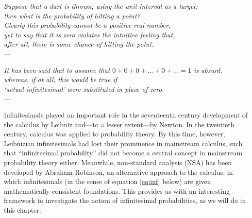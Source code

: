 \newcommand{\parthead}[2]{%
\bigskip

\begin{center}
  \spacedallcaps{Part #1}\\\vspace{.3em}
  \spacedallcaps{#2}
\end{center}

\medskip
}

\begin{flushright}
    {\footnotesize \textit{Suppose that a dart is thrown, using the unit interval as a target;\\
    then what is the probability of hitting a point?\\
    Clearly this probability cannot be a positive real number,\\
    yet to say that it is zero violates the intuitive feeling that,\\
    after all, there is some chance of hitting the point.}\\
    ---\citet[p.~171]{BernsteinWattenberg:1969}}
\end{flushright}

\begin{flushright}
    {\footnotesize \textit{It has been said that to assume that $0+0+0+ ... +0+ ... =1$ is absurd,\\
    whereas, if at all, this would be true if\\
    `actual infinitesimal' were substituted in place of zero.}\\
    ---\citet[p.~347]{deFinetti:1974}}\label{quote:dF}
\end{flushright}



\noindent Infinitesimals played an important role in the seventeenth century development of the calculus by Leibniz and---to a lesser extent---by Newton. In the twentieth century, calculus was applied to probability theory. By this time, however, Leibnizian infinitesimals had lost their prominence in mainstream calculus, such that ``infinitesimal probability'' did not become a central concept in mainstream probability theory either. Meanwhile, non-standard analysis (NSA) has been developed by Abraham Robinson, an alternative approach to the calculus, in which infinitesimals (in the sense of equation \ref{eq:inf} below) are given mathematically consistent foundations. This provides us with an interesting framework to investigate the notion of infinitesimal probabilities, as we will do in this chapter.

